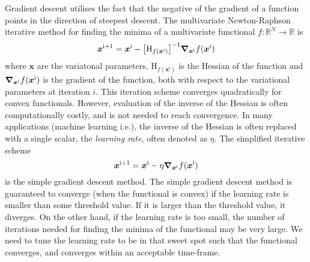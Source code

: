 Gradient descent utilises the fact that the negative of the gradient of a function points in the direction of steepest descent. The multivariate Newton-Raphson iterative method for finding the minima of a multivariate functional $f:\mathbb{R}^N\to\mathbb{R}$ is   
\begin{equation}
    \bm{x}^{\mathrm{i}+1} = \bm{x}^{\mathrm{i}} - \qty[\mathrm{H}_{f(\bm{x}^{\mathrm{i}})}]^{-1}\grad_{\bm{x}^{\mathrm{i}}} f(\bm{x}^{\mathrm{i}})
\end{equation}
where $\bm{x}$ are the variatonal parameters, $\mathrm{H}_{f(\bm{x}^{\mathrm{i}})}$ is the Hessian of the function and $\grad_{\bm{x}^{\mathrm{i}}}f(\bm{x}^{\mathrm{i}})$ is the gradient of the function, both with respect to the variational parameters at iteration $i$. This iteration scheme converges quadratically for convex functionals. However, evaluation of the inverse of the Hessian is often computationally costly, and is not needed to reach convergence. In many applications (machine learning i.e.), the inverse of the Hessian is often replaced with a single scalar, the \textit{learning rate}, often denoted as $\eta$. The simplified iterative scheme 
\begin{equation}
    \bm{x}^{\mathrm{i}+1} = \bm{x}^{\mathrm{i}} - \eta\grad_{\bm{x}^{\mathrm{i}}} f(\bm{x}^{\mathrm{i}})
\end{equation}
is the simple gradient descent method. The simple gradient descent method is guaranteed to converge (when the functional is convex) if the learning rate is smaller than some threshold value. If it is larger than the threshold value, it diverges. On the other hand, if the learning rate is too small, the number of iterations needed for finding the minima of the functional may be very large. We need to tune the learning rate to be in that sweet spot such that the functional converges, and converges within an acceptable time-frame.

